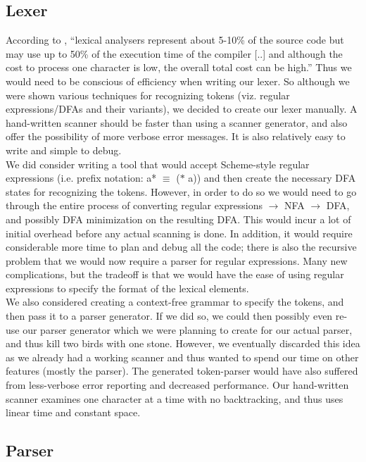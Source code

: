 \documentclass[onecolumn,11pt]{article}
\begin{document}
\subsection{Lexer}

According to \cite{davie81}, ``lexical analysers represent about 5-10\% of the source code but may use up to 50\% of the execution time of the compiler [..] and although the cost to process one character is low, the overall total cost can be high.'' Thus we would need to be conscious of efficiency when writing our lexer. So although we were shown various techniques for recognizing tokens (viz. regular expressions/DFAs and their variants), we decided to create our lexer manually. A hand-written scanner should be faster than using a scanner generator, and also offer the possibility of more verbose error messages. It is also relatively easy to write and simple to debug. \\

We did consider writing a tool that would accept Scheme-style regular expressions (i.e. prefix notation: a* $\equiv$ ($\ast$ a)) and then create the necessary DFA states for recognizing the tokens. However, in order to do so we would need to go through the entire process of converting regular expressions $\rightarrow$ NFA $\rightarrow$ DFA, and possibly DFA minimization on the resulting DFA. This would incur a lot of initial overhead before any actual scanning is done. In addition, it would require considerable more time to plan and debug all the code; there is also the recursive problem that we would now require a parser for regular expressions. Many new complications, but the tradeoff is that we would have the ease of using regular expressions to specify the format of the lexical elements. \\

We also considered creating a context-free grammar to specify the tokens, and then pass it to a parser generator. If we did so, we could then possibly even re-use our parser generator which we were planning to create for our actual parser, and thus kill two birds with one stone. However, we eventually discarded this idea as we already had a working scanner and thus wanted to spend our time on other features (mostly the parser). The generated token-parser would have also suffered from less-verbose error reporting and decreased performance. Our hand-written scanner examines one character at a time with no backtracking, and thus uses linear time and constant space.

\subsection{Parser}
\end{document}

